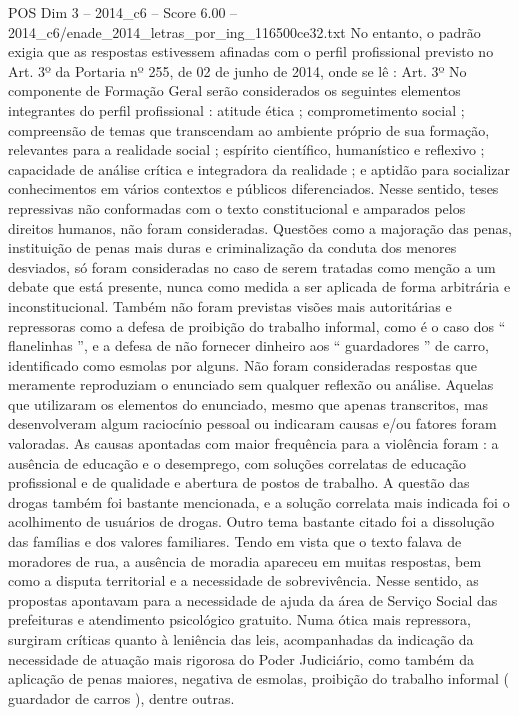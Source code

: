\begin{textsample}{POS Dim 3 – 2014\_c6 – Score 6.00 – 2014\_c6/enade\_2014\_letras\_por\_ing\_116500ce32.txt}
No entanto, o padrão exigia que as respostas estivessem afinadas com o perfil profissional previsto no Art. 3º da Portaria nº 255, de 02 de junho de 2014, onde se lê : Art. 3º No componente de Formação Geral serão considerados os seguintes elementos integrantes do perfil profissional : atitude ética ; comprometimento social ; compreensão de temas que transcendam ao ambiente próprio de sua formação, relevantes para a realidade social ; espírito científico, humanístico e reflexivo ; capacidade de análise crítica e integradora da realidade ; e aptidão para socializar conhecimentos em vários contextos e públicos diferenciados.
Nesse sentido, teses repressivas não conformadas com o texto constitucional e amparados pelos direitos humanos, não foram consideradas.
Questões como a majoração das penas, instituição de penas mais duras e criminalização da conduta dos menores desviados, só foram consideradas no caso de serem tratadas como menção a um debate que está presente, nunca como medida a ser aplicada de forma arbitrária e inconstitucional.
Também não foram previstas visões mais autoritárias e repressoras como a defesa de proibição do trabalho informal, como é o caso dos “ flanelinhas ”, e a defesa de não fornecer dinheiro aos “ guardadores ” de carro, identificado como esmolas por alguns.
Não foram consideradas respostas que meramente reproduziam o enunciado sem qualquer reflexão ou análise.
Aquelas que utilizaram os elementos do enunciado, mesmo que apenas transcritos, mas desenvolveram algum raciocínio pessoal ou indicaram causas e/ou fatores foram valoradas.
As causas apontadas com maior frequência para a violência foram : a ausência de educação e o desemprego, com soluções correlatas de educação profissional e de qualidade e abertura de postos de trabalho.
A questão das drogas também foi bastante mencionada, e a solução correlata mais indicada foi o acolhimento de usuários de drogas.
Outro tema bastante citado foi a dissolução das famílias e dos valores familiares.
Tendo em vista que o texto falava de moradores de rua, a ausência de moradia apareceu em muitas respostas, bem como a disputa territorial e a necessidade de sobrevivência.
Nesse sentido, as propostas apontavam para a necessidade de ajuda da área de Serviço Social das prefeituras e atendimento psicológico gratuito.
Numa ótica mais repressora, surgiram críticas quanto à leniência das leis, acompanhadas da indicação da necessidade de atuação mais rigorosa do Poder Judiciário, como também da aplicação de penas maiores, negativa de esmolas, proibição do trabalho informal ( guardador de carros ), dentre outras.

\end{textsample}
